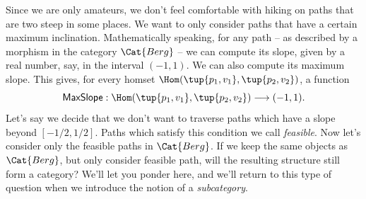 Since we are only amateurs, we don't feel comfortable with hiking on paths that are two steep in some places. We want to only consider paths that have a certain maximum inclination. Mathematically speaking, for any path -- as described by a morphism in the category $\Cat{Berg}$ -- we can compute its slope, given by a real number, say, in the interval $(-1, 1)$. We can also compute its maximum slope. This gives, for every homset $\Hom(\tup{p_1, v_1}, \tup{p_2, v_2})$, a function
$$
\mathsf{MaxSlope}: \Hom(\tup{p_1, v_1}, \tup{p_2, v_2}) \longrightarrow (-1, 1). 
$$
Let's say we decide that we don't want to traverse paths which have a slope beyond $[-1/2, 1/2]$. Paths which satisfy this condition we call \emph{feasible}. Now let's consider only the feasible paths in $\Cat{Berg}$. If we keep the same objects as $\Cat{Berg}$, but only consider feasible path, will the resulting structure still form a category? We'll let you ponder here, and we'll return to this type of question when we introduce the notion of a \emph{subcategory}. 


%
%
%


